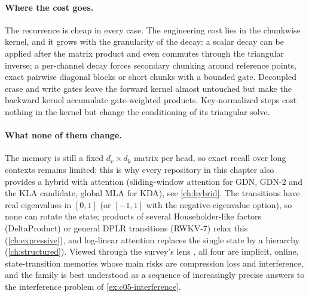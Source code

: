 \paragraph{Where the cost goes.} The recurrence is cheap in every case. The engineering cost lies
in the chunkwise kernel, and it grows with the granularity of the decay: a scalar decay can be
applied after the matrix product and even commutes through the triangular inverse; a per-channel
decay forces secondary chunking around reference points, exact pairwise diagonal blocks or short
chunks with a bounded gate. Decoupled erase and write gates leave the forward kernel almost
untouched but make the backward kernel accumulate gate-weighted products. Key-normalized steps cost
nothing in the kernel but change the conditioning of its triangular solve.

\paragraph{What none of them change.} The memory is still a fixed $d_v\times d_k$ matrix per head,
so exact recall over long contexts remains limited; this is why every repository in this chapter
also provides a hybrid with attention (sliding-window attention for GDN, GDN-2 and the KLA
candidate, global MLA for KDA), see \cref{ch:hybrid}. The transitions have real eigenvalues in $[0,1]$ (or $[-1,1]$
with the negative-eigenvalue option), so none can rotate the state; products of several
Householder-like factors (DeltaProduct) or general DPLR transitions (RWKV-7) relax this
(\cref{ch:expressive}), and log-linear attention replaces the single state by a hierarchy
(\cref{ch:structured}). Viewed through the survey's lens \citep{zhoubian2026memory}, all four are
implicit, online, state-transition memories whose main risks are compression loss and
interference, and the family is best understood as a sequence of increasingly precise answers to
the interference problem of \cref{ex:c05-interference}.

